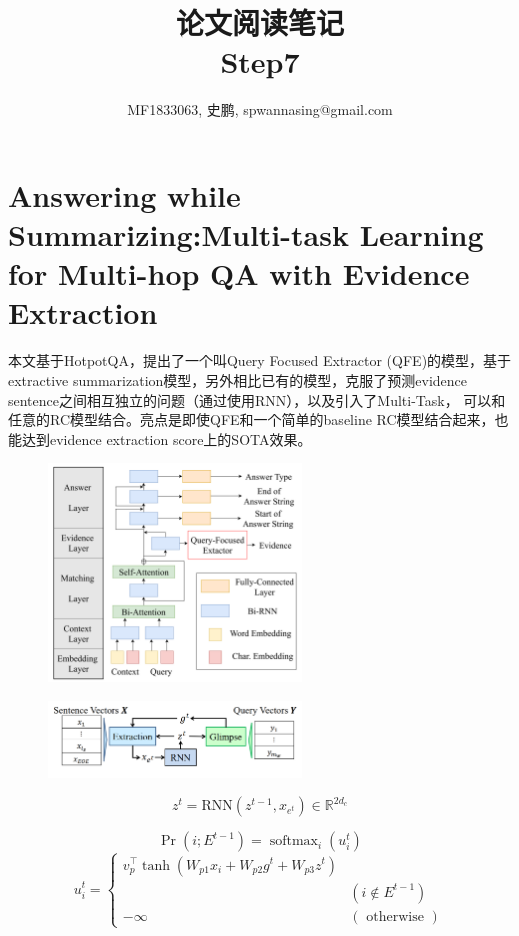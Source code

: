 \documentclass[a4paper,UTF8]{article}
\numberwithin{equation}{section}
\begin{document}
\title{论文阅读笔记\\
Step7}
\author{MF1833063, 史鹏, spwannasing@gmail.com}
\maketitle

\newpage
\section{Answering while Summarizing:Multi-task Learning for Multi-hop QA with Evidence Extraction}
本文基于HotpotQA，提出了一个叫Query Focused Extractor (QFE)的模型，基于 extractive summarization模型，另外相比已有的模型，克服了预测evidence sentence之间相互独立的问题（通过使用RNN），以及引入了Multi-Task，
可以和任意的RC模型结合。亮点是即使QFE和一个简单的baseline RC模型结合起来，也能达到evidence extraction score上的SOTA效果。
\begin{figure}[H]
	\centering
	\includegraphics[width=0.6\textwidth]{1-1.png}
\end{figure}
\begin{figure}[H]
	\centering
	\includegraphics[width=0.6\textwidth]{1-2.png}
\end{figure}
\begin{equation}
	z^{t}=\mathrm{R} \mathrm{NN}\left(z^{t-1}, x_{e^{t}}\right) \in \mathbb{R}^{2 d_{c}}
	\end{equation}

	\begin{equation}
		\operatorname{Pr}\left(i ; E^{t-1}\right)=\operatorname{softmax}_{i}\left(u_{i}^{t}\right)
		\end{equation}
		\begin{equation}
		u_{i}^{t}=\left\{\begin{array}{ll}{v_{p}^{\top} \tanh \left(W_{p 1} x_{i}+W_{p 2} g^{t}+W_{p 3} z^{t}\right)} \\ {} & {\left(i \notin E^{t-1}\right)} \\ {-\infty} & {(\text { otherwise })}\end{array}\right.
		\end{equation}
\end{document}
